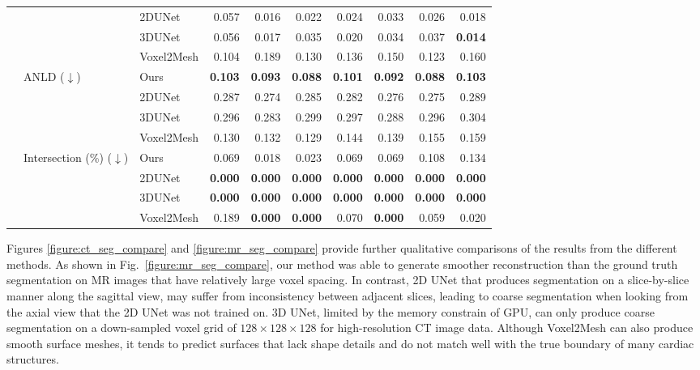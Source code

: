 \documentclass[times,review,preprint,authoryear]{elsarticle}
\begin{document}
\begin{table}
{{\begin{tabular}{lllrrrrrrr}
   &     & 2DUNet &  0.057 &  0.016 &  0.022 &  0.024 &  0.033 &  0.026 &  0.018 \\
   &     & 3DUNet &  0.056 &  0.017 &  0.035 &  0.020 &  0.034 &  0.037 &  \textbf{0.014} \\
   &     & Voxel2Mesh &  0.104 &  0.189 &  0.130 &  0.136 &  0.150 &  0.123 &  0.160 \\
\cline{2-10}
   & \multirow{4}{*}{ANLD ($\downarrow$)} & Ours &  \textbf{0.103} &  \textbf{0.093} &  \textbf{0.088} &  \textbf{0.101} &  \textbf{0.092} &  \textbf{0.088} &  \textbf{0.103} \\
   &     & 2DUNet &  0.287 &  0.274 &  0.285 &  0.282 &  0.276 &  0.275 &  0.289 \\
   &     & 3DUNet &  0.296 &  0.283 &  0.299 &  0.297 &  0.288 &  0.296 &  0.304 \\
   &     & Voxel2Mesh &  0.130 &  0.132 &  0.129 &  0.144 &  0.139 &  0.155 &  0.159 \\
\cline{2-10}
   & \multirow{4}{*}{Intersection (\%) ($\downarrow$)} & Ours &  0.069 &  0.018 &  0.023 &  0.069 &  0.069 &  0.108 &  0.134 \\
   &     & 2DUNet &  \textbf{0.000} & \textbf{0.000} &  \textbf{0.000} &  \textbf{0.000} &  \textbf{0.000} &  \textbf{0.000} &  \textbf{0.000} \\
   &     & 3DUNet &  \textbf{0.000} &  \textbf{0.000} &  \textbf{0.000} &  \textbf{0.000} &  \textbf{0.000} &  \textbf{0.000} &  \textbf{0.000} \\
   &     & Voxel2Mesh &  0.189 &  \textbf{0.000} &  \textbf{0.000} &  0.070 &  \textbf{0.000} &  0.059 &  0.020 \\
\bottomrule 
\end{tabular}
}}
\end{table}




Figures \ref{figure:ct_seg_compare} and \ref{figure:mr_seg_compare} provide further qualitative comparisons of the results from the different methods. As shown in Fig.~\ref{figure:mr_seg_compare}, our method was able to generate smoother reconstruction than the ground truth segmentation on MR images that have relatively large voxel spacing. In contrast, 2D UNet that produces segmentation on a slice-by-slice manner along the sagittal view, may suffer from inconsistency between adjacent slices, leading to coarse segmentation when looking from the axial view that the 2D UNet was not trained on. 3D UNet, limited by the memory constrain of GPU, can only produce coarse segmentation on a down-sampled voxel grid of $128\times 128 \times 128$ for high-resolution CT image data. Although Voxel2Mesh can also produce smooth surface meshes, it tends to predict surfaces that lack shape details and do not match well with the true boundary of many cardiac structures. 
\end{document}
